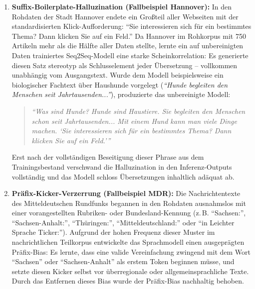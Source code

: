 \begin{enumerate}
    \item \textbf{Suffix-Boilerplate-Halluzination (Fallbeispiel Hannover):} In den Rohdaten der Stadt Hannover endete ein Großteil aller Webseiten mit der standardisierten Klick-Aufforderung: \enquote{Sie interessieren sich für ein bestimmtes Thema? Dann klicken Sie auf ein Feld.} Da Hannover im Rohkorpus mit 750 Artikeln mehr als die Hälfte aller Daten stellte, lernte ein auf unbereinigten Daten trainiertes Seq2Seq-Modell eine starke Scheinkorrelation: Es generierte diesen Satz stereotyp als Schlusselement jeder Übersetzung – vollkommen unabhängig vom Ausgangstext. Wurde dem Modell beispielsweise ein biologischer Fachtext über Haushunde vorgelegt (\textit{\enquote{Hunde begleiten den Menschen seit Jahrtausenden...}}), produzierte das unbereinigte Modell:
    \begin{quote}
        \small
        \textit{\enquote{Was sind Hunde? Hunde sind Haustiere. Sie begleiten den Menschen schon seit Jahrtausenden... Mit einem Hund kann man viele Dinge machen. \enquote{Sie interessieren sich für ein bestimmtes Thema? Dann klicken Sie auf ein Feld.}}}
    \end{quote}
    Erst nach der vollständigen Beseitigung dieser Phrase aus dem Trainingsbestand verschwand die Halluzination in den Inferenz-Outputs vollständig und das Modell schloss Übersetzungen inhaltlich adäquat ab.
    
    \item \textbf{Präfix-Kicker-Verzerrung (Fallbeispiel MDR):} Die Nachrichtentexte des Mitteldeutschen Rundfunks begannen in den Rohdaten ausnahmslos mit einer vorangestellten Rubriken- oder Bundesland-Kennung (z.\,B. \enquote{Sachsen:}, \enquote{Sachsen-Anhalt:}, \enquote{Thüringen:}, \enquote{Mitteldeutschland:} oder \enquote{in Leichter Sprache Ticker:}). Aufgrund der hohen Frequenz dieser Muster im nachrichtlichen Teilkorpus entwickelte das Sprachmodell einen ausgeprägten Präfix-Bias: Es lernte, dass eine valide Vereinfachung zwingend mit dem Wort \enquote{Sachsen} oder \enquote{Sachsen-Anhalt} als erstem Token beginnen müsse, und setzte diesen Kicker selbst vor überregionale oder allgemeinsprachliche Texte. Durch das Entfernen dieses Bias wurde der Präfix-Bias nachhaltig behoben.


\end{enumerate}
